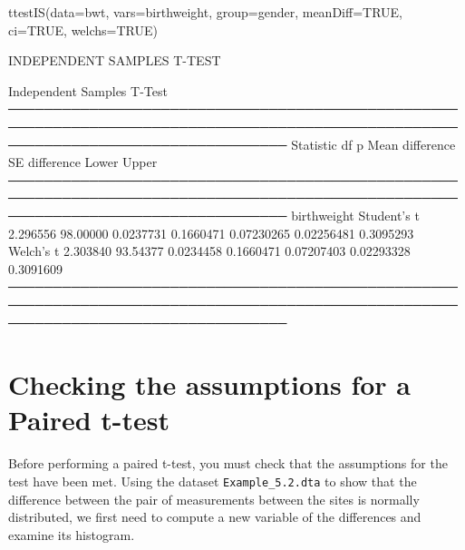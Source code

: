 \documentclass[
]{memoir}
\newenvironment{Shaded}{\begin{snugshade}}{\end{snugshade}}
\newcommand{\AttributeTok}[1]{\textcolor[rgb]{0.77,0.63,0.00}{#1}}
\newcommand{\ConstantTok}[1]{\textcolor[rgb]{0.00,0.00,0.00}{#1}}
\newcommand{\FunctionTok}[1]{\textcolor[rgb]{0.00,0.00,0.00}{#1}}
\newcommand{\NormalTok}[1]{#1}
\newcommand{\OtherTok}[1]{\textcolor[rgb]{0.56,0.35,0.01}{#1}}
\newcommand{\SpecialCharTok}[1]{\textcolor[rgb]{0.00,0.00,0.00}{#1}}
\newcommand{\StringTok}[1]{\textcolor[rgb]{0.31,0.60,0.02}{#1}}
\begin{document}
\begin{Shaded}
\begin{Highlighting}[]
\FunctionTok{ttestIS}\NormalTok{(}\AttributeTok{data=}\NormalTok{bwt, }\AttributeTok{vars=}\NormalTok{birthweight, }\AttributeTok{group=}\NormalTok{gender, }\AttributeTok{meanDiff=}\ConstantTok{TRUE}\NormalTok{, }\AttributeTok{ci=}\ConstantTok{TRUE}\NormalTok{, }\AttributeTok{welchs=}\ConstantTok{TRUE}\NormalTok{)}
\end{Highlighting}
\end{Shaded}

INDEPENDENT SAMPLES T-TEST

Independent Samples T-Test\\
───────────────────────────────────────────────────────────────────────────────────────────────────────────────────────────────────
Statistic df p Mean difference SE difference Lower Upper\\
───────────────────────────────────────────────────────────────────────────────────────────────────────────────────────────────────
birthweight Student's t 2.296556 98.00000 0.0237731 0.1660471 0.07230265 0.02256481 0.3095293\\
Welch's t 2.303840 93.54377 0.0234458 0.1660471 0.07207403 0.02293328 0.3091609\\
───────────────────────────────────────────────────────────────────────────────────────────────────────────────────────────────────

\hypertarget{checking-the-assumptions-for-a-paired-t-test}{%
\section{Checking the assumptions for a Paired t-test}\label{checking-the-assumptions-for-a-paired-t-test}}

Before performing a paired t-test, you must check that the assumptions for the test have been met. Using the dataset \texttt{Example\_5.2.dta} to show that the difference between the pair of measurements between the sites is normally distributed, we first need to compute a new variable of the differences and examine its histogram.

\begin{Shaded}
\end{Shaded}
\end{document}
